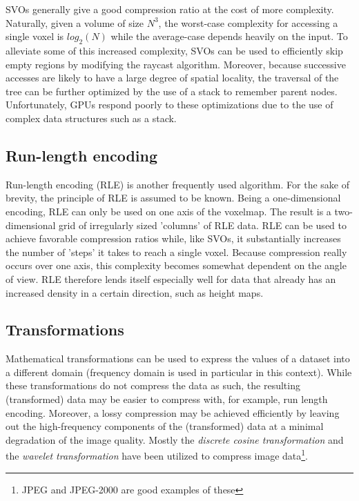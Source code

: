 SVOs generally give a good compression ratio at the cost of more complexity. Naturally, given a volume of size $N^{3}$, the worst-case complexity for accessing a single voxel is $log_{2}(N)$ while the average-case depends heavily on the input. To alleviate some of this increased complexity, SVOs can be used to efficiently skip empty regions by modifying the raycast algorithm. Moreover, because successive accesses are likely to have a large degree of spatial locality, the traversal of the tree can be further optimized by the use of a stack to remember parent nodes. Unfortunately, GPUs respond poorly to these optimizations due to the use of complex data structures such as a stack.
%
\subsection{Run-length encoding}
%
Run-length encoding (RLE) is another frequently used algorithm. For the sake of brevity, the principle of RLE is assumed to be known. Being a one-dimensional encoding, RLE can only be used on one axis of the voxelmap. The result is a two-dimensional grid of irregularly sized 'columns' of RLE data. RLE can be used to achieve favorable compression ratios \cite{forstmann11} while, like SVOs, it substantially increases the number of 'steps' it takes to reach a single voxel. Because compression really occurs over one axis, this complexity becomes somewhat dependent on the angle of view. RLE therefore lends itself especially well for data that already has an increased density in a certain direction, such as height maps.
%
\subsection{Transformations} \label{sec:transformations}
%
Mathematical transformations can be used to express the values of a dataset into a different domain (frequency domain is used in particular in this context). While these transformations do not compress the data as such, the resulting (transformed) data may be easier to compress with, for example, run length encoding. Moreover, a lossy compression may be achieved efficiently by leaving out the high-frequency components of the (transformed) data at a minimal degradation of the image quality. Mostly the \emph{discrete cosine transformation}\cite{cosinetransform94} and the \emph{wavelet transformation}\cite{waveletbook99} have been utilized to compress image data\footnote{JPEG and JPEG-2000 are good examples of these}.
%
